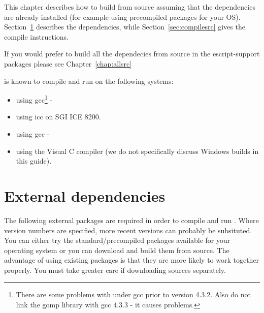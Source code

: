 
%
%
%



This chapter describes how to build \esfinley from source assuming that the dependencies are already installed (for example using precompiled packages for your OS).
Section~\ref{sec:deps} describes the dependencies, while Section~\ref{sec:compilesrc} gives the compile instructions.

If you would prefer to build all the dependecies from source in the escript-support packages please see Chapter~\ref{chap:allsrc}

\esfinley is known to compile and run on the following systems:
\begin{itemize}
 \item \linux using gcc\footnote{There are some problems with \openmp under gcc prior to version 4.3.2. Also do not link the gomp library with gcc 4.3.3 - it causes problems.} - 
\item \linux using icc on SGI ICE 8200.
\item \macosx using gcc - 
\item \winxp using the Visual C compiler (we do not specifically discuss Windows builds in this guide).
\end{itemize}

\section{External dependencies}
\label{sec:deps}
The following external packages are required in order to compile and run \esfinley.
Where version numbers are specified, more recent versions can probably be subsituted.
You can either try the standard/precompiled packages available for your operating system or you can download and build them from source.
The advantage of using existing packages is that they are more likely to work together properly.
You must take greater care if downloading sources separately.

